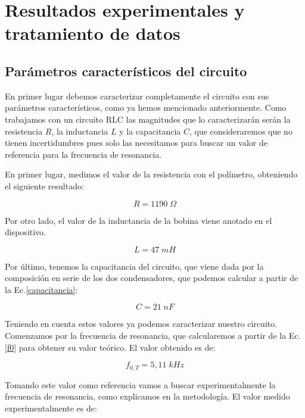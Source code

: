 \documentclass[a4paper,12pt,titlepage]{article}
\begin{document}
\newpage

\section{Resultados experimentales y tratamiento de datos}

\subsection{Parámetros característicos del circuito}

En primer lugar debemos caracterizar completamente el circuito con sus parámetros característicos, como ya hemos mencionado anteriormente. Como trabajamos con un circuito RLC las magnitudes que lo caracterizarán serán la resistencia $R$, la inductancia $L$ y la capacitancia $C$, que consideraremos que no tienen incertidumbres pues solo las necesitamos para buscar un valor de referencia para la frecuencia de resonancia.

En primer lugar, medimos el valor de la resistencia con el polímetro, obteniendo el siguiente resultado:

\begin{equation}
    R = 1190\; \Omega
\end{equation}

Por otro lado, el valor de la inductancia de la bobina viene anotado en el dispositivo. 

\begin{equation}
    L = 47 \;mH
\end{equation}

Por último, tenemos la capacitancia del circuito, que viene dada por la composición en serie de los dos condensadores, que podemos calcular a partir de la Ec.\ref{capacitancia}:

\begin{equation}
    C = 21 \; nF
\end{equation}

Teniendo en cuenta estos valores ya podemos caracterizar nuestro circuito. Comenzamos por la frecuencia de resonancia, que calcularemos a partir de la Ec.\ref{f0} para obtener su valor teórico. El valor obtenido es de:

\begin{equation}
    f_{0,T} = 5,11 \; kHz
\end{equation}

Tomando este valor como referencia vamos a buscar experimentalmente la frecuencia de resonancia, como explicamos en la metodología. El valor medido experimentalmente es de:
\end{document}
